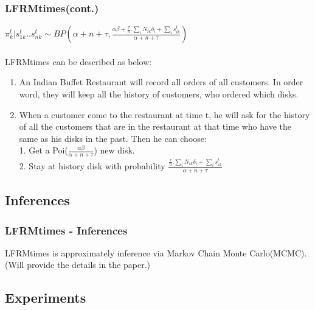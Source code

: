 \documentclass{beamer}
\begin{document}

\begin{frame}
\frametitle{LFRMtimes(cont.)}
$\pi_{k}^{t}|s_{1k}^{t}..s_{nk}^{t} \sim BP(\alpha + n + \tau, \frac{\alpha\beta + \frac{\tau}{n} . \sum_{i} N_{ik}\delta_{i} + \sum_{i}s_{ik}^{t}}{\alpha + n + \tau})$
\\
~\\
LFRMtimes can be described as below:
\begin{enumerate}
\item An Indian Buffet Restaurant will record all orders of all customers. In order word, they will keep all the history of customers, who ordered which disks.
\item When a customer come to the restaurant at time t, he will ask for the history of all the customers that are in the restaurant at that time who have the same as his disks in the past. Then he can choose:
\hfill \\ 1. Get a Poi($\frac{\alpha\beta}{\alpha + n + \tau}$) new disk.
\hfill \\ 2. Stay at history disk with probability $\frac{\frac{\tau}{n}.\sum_{i} N_{ik}\delta_{i} + \sum_{i}s_{ik}^{t}}{\alpha + n + \tau}$
\end{enumerate}
\end{frame}


\subsection{Inferences} %

\begin{frame}
\frametitle{LFRMtimes - Inferences}
LFRMtimes is approximately inference via Markov Chain Monte Carlo(MCMC).
(Will provide the details in the paper.)
\end{frame}


\subsection{Experiments} %
\end{document}
